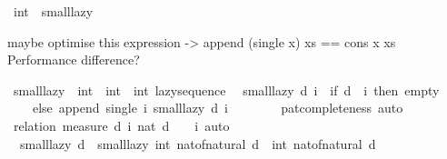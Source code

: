 \begin{isabellebody}
\ int\ {\isacharcolon}{\kern0pt}{\isacharcolon}{\kern0pt}\ small{\isacharunderscore}{\kern0pt}lazy\isanewline
{}%
\begin{isamarkuptext}%
maybe optimise this expression -> append (single x) xs == cons x xs 
Performance difference?%
\end{isamarkuptext}\isamarkuptrue%
\isamarkupfalse%
\ small{\isacharunderscore}{\kern0pt}lazy{\isacharprime}{\kern0pt}\ {\isacharcolon}{\kern0pt}{\isacharcolon}{\kern0pt}\ {\isachardoublequoteopen}int\ {\isasymRightarrow}\ int\ {\isasymRightarrow}\ int\ lazy{\isacharunderscore}{\kern0pt}sequence{\isachardoublequoteclose}\isanewline
{}\isanewline
\ \ {\isachardoublequoteopen}small{\isacharunderscore}{\kern0pt}lazy{\isacharprime}{\kern0pt}\ d\ i\ {\isacharequal}{\kern0pt}\ {\isacharparenleft}{\kern0pt}if\ d\ {\isacharless}{\kern0pt}\ i\ then\ empty\isanewline
\ \ \ \ else\ append\ {\isacharparenleft}{\kern0pt}single\ i{\isacharparenright}{\kern0pt}\ {\isacharparenleft}{\kern0pt}small{\isacharunderscore}{\kern0pt}lazy{\isacharprime}{\kern0pt}\ d\ {\isacharparenleft}{\kern0pt}i\ {\isacharplus}{\kern0pt}\ {}{\isacharparenright}{\kern0pt}{\isacharparenright}{\kern0pt}{\isacharparenright}{\kern0pt}{\isachardoublequoteclose}\isanewline
%
\isadelimproof
\ \ \ \ %
\endisadelimproof
%
\isatagproof
{}\isamarkupfalse%
\ pat{\isacharunderscore}{\kern0pt}completeness\ auto%
\endisatagproof
{\isafoldproof}%
%
\isadelimproof
\isanewline
%
\endisadelimproof
\isanewline
{}\isamarkupfalse%
\ \isanewline
%
\isadelimproof
\ \ %
\endisadelimproof
%
\isatagproof
{}\isamarkupfalse%
\ {\isacharparenleft}{\kern0pt}relation\ {\isachardoublequoteopen}measure\ {\isacharparenleft}{\kern0pt}{\isacharpercent}{\kern0pt}{\isacharparenleft}{\kern0pt}d{\isacharcomma}{\kern0pt}\ i{\isacharparenright}{\kern0pt}{\isachardot}{\kern0pt}\ nat\ {\isacharparenleft}{\kern0pt}d\ {\isacharplus}{\kern0pt}\ {}\ {\isacharminus}{\kern0pt}\ i{\isacharparenright}{\kern0pt}{\isacharparenright}{\kern0pt}{\isachardoublequoteclose}{\isacharparenright}{\kern0pt}\ auto%
\endisatagproof
{\isafoldproof}%
%
\isadelimproof
\isanewline
%
\endisadelimproof
\isanewline
{}\isamarkupfalse%
\isanewline
\ \ {\isachardoublequoteopen}small{\isacharunderscore}{\kern0pt}lazy\ d\ {\isacharequal}{\kern0pt}\ small{\isacharunderscore}{\kern0pt}lazy{\isacharprime}{\kern0pt}\ {\isacharparenleft}{\kern0pt}int\ {\isacharparenleft}{\kern0pt}nat{\isacharunderscore}{\kern0pt}of{\isacharunderscore}{\kern0pt}natural\ d{\isacharparenright}{\kern0pt}{\isacharparenright}{\kern0pt}\ {\isacharparenleft}{\kern0pt}{\isacharminus}{\kern0pt}\ {\isacharparenleft}{\kern0pt}int\ {\isacharparenleft}{\kern0pt}nat{\isacharunderscore}{\kern0pt}of{\isacharunderscore}{\kern0pt}natural\ d{\isacharparenright}{\kern0pt}{\isacharparenright}{\kern0pt}{\isacharparenright}{\kern0pt}{\isachardoublequoteclose}\isanewline

\end{isabellebody}
